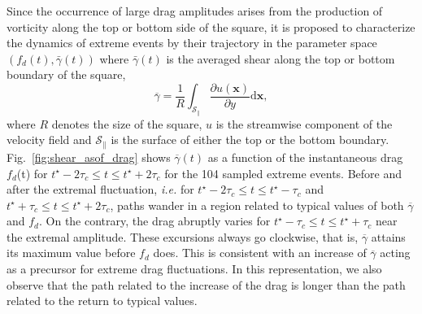 \documentclass[pre,aps,floatfix,10pt,superscriptaddress, notitlepage,preprint]{revtex4-1}
\begin{document}
Since the occurrence of large drag amplitudes arises from the production of vorticity along the top or bottom side of the square, it is  proposed to characterize the dynamics of extreme events by their trajectory in the parameter space $(f_d(t), \bar{\gamma}(t))$ where $\bar{\gamma}(t)$ is the averaged shear along the top or bottom boundary of the square,
\begin{equation}
  \label{eq:avg_shear_def}
  \overline{\gamma} = \frac{1}{R} \int_{\mathcal{S}_\parallel} \frac{\partial u(\mathbf{x})}{\partial y}\mathrm{d}\mathbf{x},
\end{equation}
where $R$ denotes the size of the square, $u$ is the streamwise component of the velocity field and $\mathcal{S}_\parallel$ is the surface of either the top or the bottom boundary.
%
%
Fig.~\ref{fig:shear_asof_drag} shows $\overline{\gamma}(t)$ as a function of the instantaneous drag $f_d$(t) for $t^{\star}-2\tau_c \leq t \leq  t^{\star}+2\tau_c$ for the 104 sampled extreme events.
Before and after the extremal fluctuation, \textit{i.e.} for $t^{\star}-2\tau_c \leq t \leq t^{\star}-\tau_c$ and $t^{\star}+\tau_c \leq t \leq t^{\star}+2\tau_c$, paths wander in a region related to typical values of both $\overline{\gamma}$ and $f_d$.
On the contrary, the drag abruptly varies for $t^{\star}-\tau_c \leq t \leq t^{\star}+\tau_c$ near the extremal amplitude.
These excursions always go clockwise, that is, $\overline{\gamma}$ attains its maximum value before $f_d$ does. 
This is consistent with an increase of $\overline{\gamma}$ acting as a precursor for extreme drag fluctuations.
In this representation, we also observe that the path related to the increase of the drag is longer than the path related to the return to typical values. 


\end{document}
